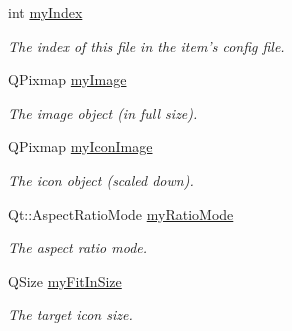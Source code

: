 \begin{DoxyCompactItemize}
\item 
\hypertarget{class_u_i_1_1_image_item_widget_a61d413a45eef2f648f9fa5114ec8ca0c}{int \hyperlink{class_u_i_1_1_image_item_widget_a61d413a45eef2f648f9fa5114ec8ca0c}{my\-Index}}\label{class_u_i_1_1_image_item_widget_a61d413a45eef2f648f9fa5114ec8ca0c}

\begin{DoxyCompactList}\small\item\em The index of this file in the item's config file. \end{DoxyCompactList}\item 
\hypertarget{class_u_i_1_1_image_item_widget_af9b22120667309cb4527a658b7b00ce5}{Q\-Pixmap \hyperlink{class_u_i_1_1_image_item_widget_af9b22120667309cb4527a658b7b00ce5}{my\-Image}}\label{class_u_i_1_1_image_item_widget_af9b22120667309cb4527a658b7b00ce5}

\begin{DoxyCompactList}\small\item\em The image object (in full size). \end{DoxyCompactList}\item 
\hypertarget{class_u_i_1_1_image_item_widget_a15f90dc62d2ea1e17f45b94a7739dff8}{Q\-Pixmap \hyperlink{class_u_i_1_1_image_item_widget_a15f90dc62d2ea1e17f45b94a7739dff8}{my\-Icon\-Image}}\label{class_u_i_1_1_image_item_widget_a15f90dc62d2ea1e17f45b94a7739dff8}

\begin{DoxyCompactList}\small\item\em The icon object (scaled down). \end{DoxyCompactList}\item 
\hypertarget{class_u_i_1_1_image_item_widget_ab2a6cff11d51c78df4c255acc656be3d}{Qt\-::\-Aspect\-Ratio\-Mode \hyperlink{class_u_i_1_1_image_item_widget_ab2a6cff11d51c78df4c255acc656be3d}{my\-Ratio\-Mode}}\label{class_u_i_1_1_image_item_widget_ab2a6cff11d51c78df4c255acc656be3d}

\begin{DoxyCompactList}\small\item\em The aspect ratio mode. \end{DoxyCompactList}\item 
\hypertarget{class_u_i_1_1_image_item_widget_a8191ccec61734bb18e1687c9b2a0dad2}{Q\-Size \hyperlink{class_u_i_1_1_image_item_widget_a8191ccec61734bb18e1687c9b2a0dad2}{my\-Fit\-In\-Size}}\label{class_u_i_1_1_image_item_widget_a8191ccec61734bb18e1687c9b2a0dad2}

\begin{DoxyCompactList}\small\item\em The target icon size. \end{DoxyCompactList}\end{DoxyCompactItemize}
